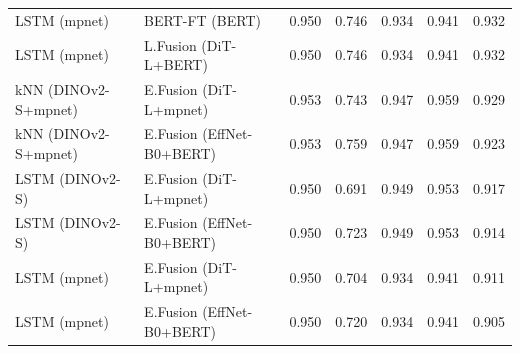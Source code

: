 \begin{longtable}{llrrrrr}
LSTM (mpnet) & BERT-FT (BERT) & 0.950 & 0.746 & 0.934 & 0.941 & 0.932 \\
LSTM (mpnet) & L.Fusion (DiT-L+BERT) & 0.950 & 0.746 & 0.934 & 0.941 & 0.932 \\
kNN (DINOv2-S+mpnet) & E.Fusion (DiT-L+mpnet) & 0.953 & 0.743 & 0.947 & 0.959 & 0.929 \\
kNN (DINOv2-S+mpnet) & E.Fusion (EffNet-B0+BERT) & 0.953 & 0.759 & 0.947 & 0.959 & 0.923 \\
LSTM (DINOv2-S) & E.Fusion (DiT-L+mpnet) & 0.950 & 0.691 & 0.949 & 0.953 & 0.917 \\
LSTM (DINOv2-S) & E.Fusion (EffNet-B0+BERT) & 0.950 & 0.723 & 0.949 & 0.953 & 0.914 \\
LSTM (mpnet) & E.Fusion (DiT-L+mpnet) & 0.950 & 0.704 & 0.934 & 0.941 & 0.911 \\
LSTM (mpnet) & E.Fusion (EffNet-B0+BERT) & 0.950 & 0.720 & 0.934 & 0.941 & 0.905 \\
\end{longtable}


